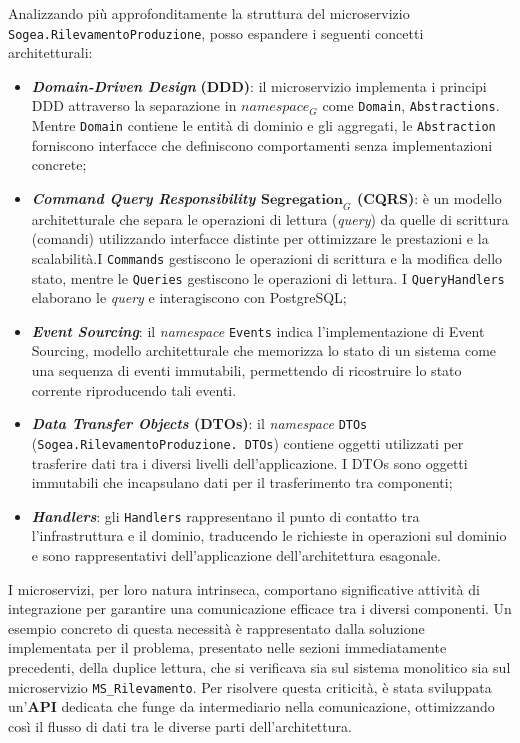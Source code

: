         \vspace{0.2 em}
        \noindent Analizzando più approfonditamente la struttura del microservizio \texttt{Sogea.Rilevamento}\texttt{Produzione}, posso espandere i seguenti concetti architetturali:
        \begin{itemize}
            \item \textbf{\textit{Domain-Driven Design}} \textbf{(DDD)}: il microservizio implementa i principi DDD attraverso la separazione in \textit{$namespace_G$} come \texttt{Domain}, \texttt{Abstractions}. Mentre \texttt{Domain} contiene le entità di dominio e gli aggregati, le \texttt{Abstraction} forniscono interfacce che definiscono comportamenti senza implementazioni concrete;
            \item \textbf{\textit{Command Query Responsibility $\textbf{Segregation}_G$} (CQRS)}: è un modello architetturale che separa le operazioni di lettura (\textit{query}) da quelle di scrittura (comandi) utilizzando interfacce distinte per ottimizzare le prestazioni e la scalabilità.I \texttt{Commands} gestiscono le operazioni di scrittura e la modifica dello stato, mentre le \texttt{Queries} gestiscono le operazioni di lettura. I \texttt{QueryHandlers} elaborano le \textit{query} e interagiscono con PostgreSQL;
            \item \textbf{\textit{Event Sourcing}}: il \textit{namespace} \texttt{Events} indica l'implementazione di Event Sourcing,  modello architetturale che memorizza lo stato di un sistema come una sequenza di eventi immutabili, permettendo di ricostruire lo stato corrente riproducendo tali eventi.
            \item \textbf{\textit{Data Transfer Objects} (DTOs)}: il \textit{namespace} \texttt{DTOs} (\texttt{Sogea.RilevamentoProduzione.}\texttt{ DTOs}) contiene oggetti utilizzati per trasferire dati tra i diversi livelli dell'applicazione. I DTOs sono oggetti immutabili che incapsulano dati per il trasferimento tra componenti;
            \item \textbf{\textit{Handlers}}: gli \texttt{Handlers} rappresentano il punto di contatto tra l'infrastruttura e il dominio, traducendo le richieste in operazioni sul dominio e sono rappresentativi dell'applicazione dell'architettura esagonale.
        \end{itemize}

        \vspace{0.2 em}
        \noindent I microservizi, per loro natura intrinseca, comportano significative attività di integrazione per garantire una comunicazione efficace tra i diversi componenti. Un esempio concreto di questa necessità è rappresentato dalla soluzione implementata per il problema, presentato nelle sezioni immediatamente precedenti, della duplice lettura, che si verificava sia sul sistema monolitico sia sul microservizio \texttt{MS\_Rilevamento}. Per risolvere questa criticità, è stata sviluppata un'\textbf{API} dedicata che funge da intermediario nella comunicazione, ottimizzando così il flusso di dati tra le diverse parti dell'architettura.

